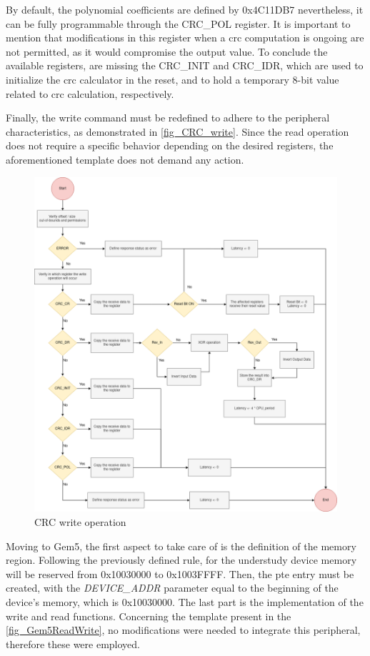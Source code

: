 By default, the polynomial coefficients are defined by 0x4C11DB7 nevertheless, it can be fully programmable through the CRC\_POL register.
It is important to mention that modifications in this register when a \gls{crc} computation is ongoing are not permitted, as it would 
compromise the output value. To conclude the available registers, are missing the CRC\_INIT and CRC\_IDR, which are used to initialize 
the \gls{crc} calculator in the reset, and to hold a temporary 8-bit value related to \gls{crc} calculation, respectively. 

Finally, the write command must be redefined to adhere to the peripheral characteristics, as demonstrated in \autoref{fig_CRC_write}.
Since the read operation does not require a specific behavior depending on the desired registers, the aforementioned template does not demand any
action.   

\begin{figure}[]
	\centering
 	\includegraphics[width=0.7\linewidth]{Images/CRC_write.png}
 	\caption{CRC write operation}
	 \label{fig_CRC_write}
\end{figure}


Moving to Gem5, the first aspect to take care of is the definition of the memory region. Following the previously defined rule, for the understudy device 
memory will be reserved from 0x10030000 to 0x1003FFFF. Then, the \gls{pte} entry must be created, with the \textit{DEVICE\_ADDR} parameter equal to 
the beginning of the device's memory, which is 0x10030000. The last part is the implementation of the write and read functions. Concerning the 
template present in the \autoref{fig_Gem5ReadWrite}, no modifications were needed to integrate this peripheral, therefore these were employed. 

